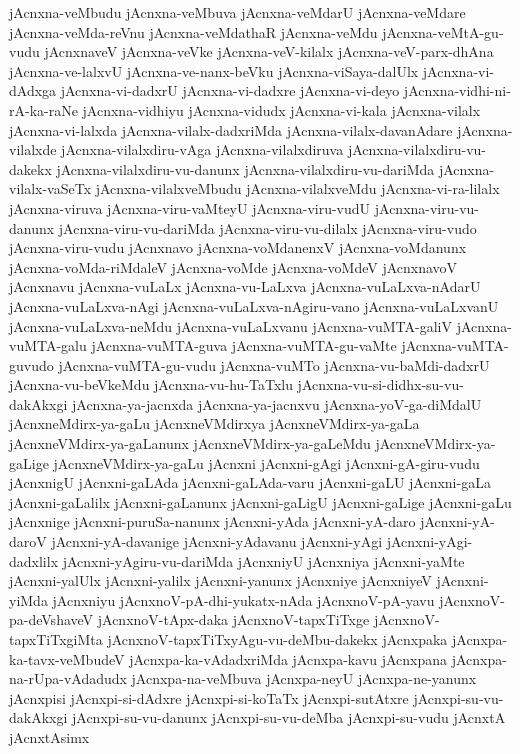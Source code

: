 {jAcnxna-veMbudu
jAcnxna-veMbuva
jAcnxna-veMdarU
jAcnxna-veMdare
jAcnxna-veMda-reVnu
jAcnxna-veMdathaR
jAcnxna-veMdu
jAcnxna-veMtA-gu-vudu
jAcnxnaveV
jAcnxna-veVke
jAcnxna-veV-kilalx
jAcnxna-veV-parx-dhAna
jAcnxna-ve-lalxvU
jAcnxna-ve-nanx-beVku
jAcnxna-viSaya-dalUlx
jAcnxna-vi-dAdxga
jAcnxna-vi-dadxrU
jAcnxna-vi-dadxre
jAcnxna-vi-deyo
jAcnxna-vidhi-ni-rA-ka-raNe
jAcnxna-vidhiyu
jAcnxna-vidudx
jAcnxna-vi-kala
jAcnxna-vilalx
jAcnxna-vi-lalxda
jAcnxna-vilalx-dadxriMda
jAcnxna-vilalx-davanAdare
jAcnxna-vilalxde
jAcnxna-vilalxdiru-vAga
jAcnxna-vilalxdiruva
jAcnxna-vilalxdiru-vu-dakekx
jAcnxna-vilalxdiru-vu-danunx
jAcnxna-vilalxdiru-vu-dariMda
jAcnxna-vilalx-vaSeTx
jAcnxna-vilalxveMbudu
jAcnxna-vilalxveMdu
jAcnxna-vi-ra-lilalx
jAcnxna-viruva
jAcnxna-viru-vaMteyU
jAcnxna-viru-vudU
jAcnxna-viru-vu-danunx
jAcnxna-viru-vu-dariMda
jAcnxna-viru-vu-dilalx
jAcnxna-viru-vudo
jAcnxna-viru-vudu
jAcnxnavo
jAcnxna-voMdanenxV
jAcnxna-voMdanunx
jAcnxna-voMda-riMdaleV
jAcnxna-voMde
jAcnxna-voMdeV
jAcnxnavoV
jAcnxnavu
jAcnxna-vuLaLx
jAcnxna-vu-LaLxva
jAcnxna-vuLaLxva-nAdarU
jAcnxna-vuLaLxva-nAgi
jAcnxna-vuLaLxva-nAgiru-vano
jAcnxna-vuLaLxvanU
jAcnxna-vuLaLxva-neMdu
jAcnxna-vuLaLxvanu
jAcnxna-vuMTA-galiV
jAcnxna-vuMTA-galu
jAcnxna-vuMTA-guva
jAcnxna-vuMTA-gu-vaMte
jAcnxna-vuMTA-guvudo
jAcnxna-vuMTA-gu-vudu
jAcnxna-vuMTo
jAcnxna-vu-baMdi-dadxrU
jAcnxna-vu-beVkeMdu
jAcnxna-vu-hu-TaTxlu
jAcnxna-vu-si-didhx-su-vu-dakAkxgi
jAcnxna-ya-jacnxda
jAcnxna-ya-jacnxvu
jAcnxna-yoV-ga-diMdalU
jAcnxneMdirx-ya-gaLu
jAcnxneVMdirxya
jAcnxneVMdirx-ya-gaLa
jAcnxneVMdirx-ya-gaLanunx
jAcnxneVMdirx-ya-gaLeMdu
jAcnxneVMdirx-ya-gaLige
jAcnxneVMdirx-ya-gaLu
jAcnxni
jAcnxni-gAgi
jAcnxni-gA-giru-vudu
jAcnxnigU
jAcnxni-gaLAda
jAcnxni-gaLAda-varu
jAcnxni-gaLU
jAcnxni-gaLa
jAcnxni-gaLalilx
jAcnxni-gaLanunx
jAcnxni-gaLigU
jAcnxni-gaLige
jAcnxni-gaLu
jAcnxnige
jAcnxni-puruSa-nanunx
jAcnxni-yAda
jAcnxni-yA-daro
jAcnxni-yA-daroV
jAcnxni-yA-davanige
jAcnxni-yAdavanu
jAcnxni-yAgi
jAcnxni-yAgi-dadxlilx
jAcnxni-yAgiru-vu-dariMda
jAcnxniyU
jAcnxniya
jAcnxni-yaMte
jAcnxni-yalUlx
jAcnxni-yalilx
jAcnxni-yanunx
jAcnxniye
jAcnxniyeV
jAcnxni-yiMda
jAcnxniyu
jAcnxnoV-pA-dhi-yukatx-nAda
jAcnxnoV-pA-yavu
jAcnxnoV-pa-deVshaveV
jAcnxnoV-tApx-daka
jAcnxnoV-tapxTiTxge
jAcnxnoV-tapxTiTxgiMta
jAcnxnoV-tapxTiTxyAgu-vu-deMbu-dakekx
jAcnxpaka
jAcnxpa-ka-tavx-veMbudeV
jAcnxpa-ka-vAdadxriMda
jAcnxpa-kavu
jAcnxpana
jAcnxpa-na-rUpa-vAdadudx
jAcnxpa-na-veMbuva
jAcnxpa-neyU
jAcnxpa-ne-yanunx
jAcnxpisi
jAcnxpi-si-dAdxre
jAcnxpi-si-koTaTx
jAcnxpi-sutAtxre
jAcnxpi-su-vu-dakAkxgi
jAcnxpi-su-vu-danunx
jAcnxpi-su-vu-deMba
jAcnxpi-su-vudu
jAcnxtA
jAcnxtAsimx
}
